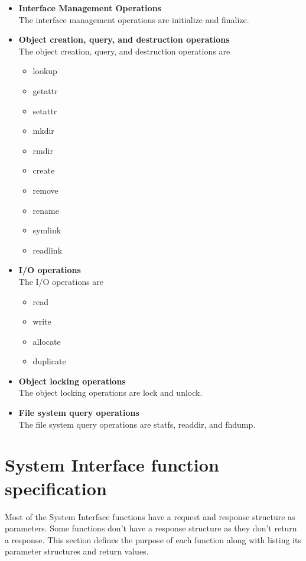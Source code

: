 \documentclass[11pt, letterpaper]{article}
\begin{document}
\begin{itemize}
\item\textbf{Interface Management Operations}\\
The interface management operations are initialize and finalize.

\item\textbf{Object creation, query, and destruction operations}\\
The object creation, query, and destruction operations are 
\begin{itemize}
\item lookup
\item getattr
\item setattr
\item mkdir
\item rmdir
\item create
\item remove
\item rename
\item symlink
\item readlink
\end{itemize}

\item\textbf{I/O operations}\\
The I/O operations are
\begin{itemize}
\item read
\item write
\item allocate
\item duplicate
\end{itemize}

\item\textbf{Object locking operations}\\
The object locking operations are lock and unlock.

\item\textbf{File system query operations}\\
The file system query operations are statfs, readdir, and fhdump.
\end{itemize}

\section{System Interface function specification}

Most of the System Interface functions have a request and response
structure as parameters. Some functions don't have a response structure
as they don't return a response. This section defines the purpose of
each function along with listing its parameter structures and return
values.
\end{document}
